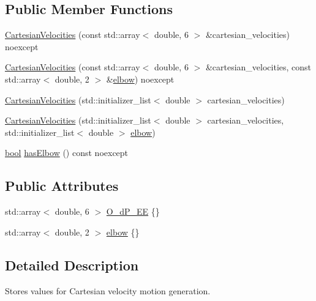 \subsection*{Public Member Functions}
\begin{DoxyCompactItemize}
\item 
\hyperlink{classfranka_1_1CartesianVelocities_a713380954e1f10c1be3033b95ca00657}{Cartesian\+Velocities} (const std\+::array$<$ double, 6 $>$ \&cartesian\+\_\+velocities) noexcept
\item 
\hyperlink{classfranka_1_1CartesianVelocities_a95f6feec3539ed9f96d555447717eb72}{Cartesian\+Velocities} (const std\+::array$<$ double, 6 $>$ \&cartesian\+\_\+velocities, const std\+::array$<$ double, 2 $>$ \&\hyperlink{classfranka_1_1CartesianVelocities_a6419df1399d3dfab79b1654b94ced344}{elbow}) noexcept
\item 
\hyperlink{classfranka_1_1CartesianVelocities_a39c4b06c315c963460e24324de8ad079}{Cartesian\+Velocities} (std\+::initializer\+\_\+list$<$ double $>$ cartesian\+\_\+velocities)
\item 
\hyperlink{classfranka_1_1CartesianVelocities_aec434afa3f92e462ad3ab4766d3456a4}{Cartesian\+Velocities} (std\+::initializer\+\_\+list$<$ double $>$ cartesian\+\_\+velocities, std\+::initializer\+\_\+list$<$ double $>$ \hyperlink{classfranka_1_1CartesianVelocities_a6419df1399d3dfab79b1654b94ced344}{elbow})
\item 
\hyperlink{classbool}{bool} \hyperlink{classfranka_1_1CartesianVelocities_a51a41893b10250982597fe367abb2ca6}{has\+Elbow} () const noexcept
\end{DoxyCompactItemize}
\subsection*{Public Attributes}
\begin{DoxyCompactItemize}
\item 
std\+::array$<$ double, 6 $>$ \hyperlink{classfranka_1_1CartesianVelocities_ab7a42c7c1ee7109025aff5c43a56b398}{O\+\_\+d\+P\+\_\+\+EE} \{\}
\item 
std\+::array$<$ double, 2 $>$ \hyperlink{classfranka_1_1CartesianVelocities_a6419df1399d3dfab79b1654b94ced344}{elbow} \{\}
\end{DoxyCompactItemize}


\subsection{Detailed Description}
Stores values for Cartesian velocity motion generation. 

